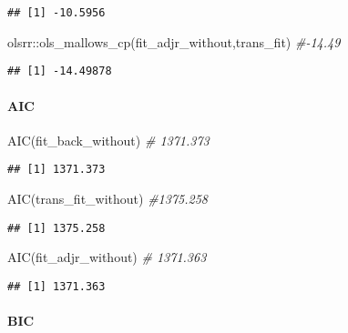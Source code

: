 \documentclass[
]{article}
\newenvironment{Shaded}{\begin{snugshade}}{\end{snugshade}}
\newcommand{\CommentTok}[1]{\textcolor[rgb]{0.56,0.35,0.01}{\textit{#1}}}
\newcommand{\FunctionTok}[1]{\textcolor[rgb]{0.00,0.00,0.00}{#1}}
\newcommand{\NormalTok}[1]{#1}
\newcommand{\SpecialCharTok}[1]{\textcolor[rgb]{0.00,0.00,0.00}{#1}}
\begin{document}
\begin{verbatim}
## [1] -10.5956
\end{verbatim}

\begin{Shaded}
\begin{Highlighting}[]
\NormalTok{olsrr}\SpecialCharTok{::}\FunctionTok{ols\_mallows\_cp}\NormalTok{(fit\_adjr\_without,trans\_fit) }\CommentTok{\#{-}14.49}
\end{Highlighting}
\end{Shaded}

\begin{verbatim}
## [1] -14.49878
\end{verbatim}

\hypertarget{aic}{%
\paragraph{AIC}\label{aic}}

\begin{Shaded}
\begin{Highlighting}[]
\FunctionTok{AIC}\NormalTok{(fit\_back\_without) }\CommentTok{\# 1371.373}
\end{Highlighting}
\end{Shaded}

\begin{verbatim}
## [1] 1371.373
\end{verbatim}

\begin{Shaded}
\begin{Highlighting}[]
\FunctionTok{AIC}\NormalTok{(trans\_fit\_without) }\CommentTok{\#1375.258}
\end{Highlighting}
\end{Shaded}

\begin{verbatim}
## [1] 1375.258
\end{verbatim}

\begin{Shaded}
\begin{Highlighting}[]
\FunctionTok{AIC}\NormalTok{(fit\_adjr\_without) }\CommentTok{\# 1371.363}
\end{Highlighting}
\end{Shaded}

\begin{verbatim}
## [1] 1371.363
\end{verbatim}

\hypertarget{bic}{%
\paragraph{BIC}\label{bic}}
\end{document}
